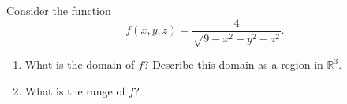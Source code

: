 \begin{problem}
Consider the function
\[
f(x,y,z) = \frac{4}{\sqrt{9-x^2-y^2-z^2}}.
\]
\begin{enumerate}
\item What is the domain of $f$? Describe this domain as a region in $\mathbb{R}^3$.
\item What is the range of $f$?
\end{enumerate}
\end{problem}